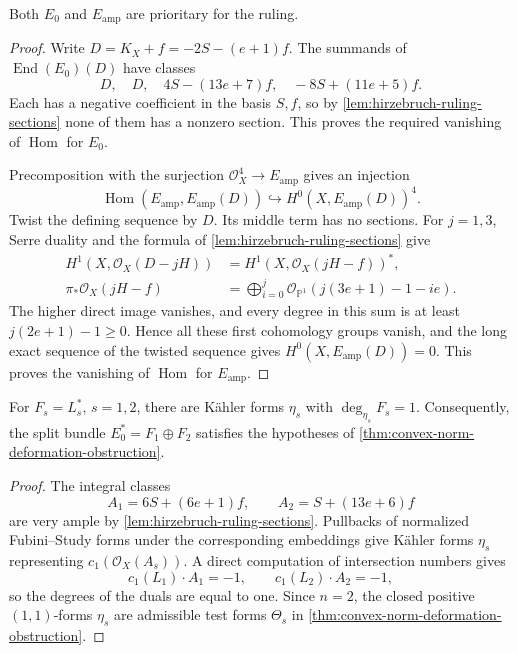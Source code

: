 \begin{lemma}\label{lem:hirzebruch-prioritary-comparison}
Both $E_0$ and $E_{\mathrm{amp}}$ are prioritary for the ruling.
\end{lemma}
\begin{proof}
Write $D=K_X+f=-2S-(e+1)f$. The summands of $\operatorname{End}(E_0)(D)$ have classes
\[
 D,\quad D,\quad 4S-(13e+7)f,\quad -8S+(11e+5)f.
\]
Each has a negative coefficient in the basis $S,f$, so by \cref{lem:hirzebruch-ruling-sections} none of them has a nonzero section. This proves the required vanishing of $\operatorname{Hom}$ for $E_0$.

Precomposition with the surjection $\mathcal O_X^4\to E_{\mathrm{amp}}$ gives an injection
\[
 \operatorname{Hom}(E_{\mathrm{amp}},E_{\mathrm{amp}}(D))
 \hookrightarrow H^0(X,E_{\mathrm{amp}}(D))^4.
\]
Twist the defining sequence by $D$. Its middle term has no sections. For $j=1,3$, Serre duality and the formula of \cref{lem:hirzebruch-ruling-sections} give
\[
 \begin{aligned}
 H^1(X,\mathcal O_X(D-jH))&=H^1(X,\mathcal O_X(jH-f))^*,\\
 \pi_*\mathcal O_X(jH-f)&=\bigoplus_{i=0}^j\mathcal O_{\mathbb P^1}(j(3e+1)-1-ie).
 \end{aligned}
\]
The higher direct image vanishes, and every degree in this sum is at least $j(2e+1)-1\geq0$. Hence all these first cohomology groups vanish, and the long exact sequence of the twisted sequence gives $H^0(X,E_{\mathrm{amp}}(D))=0$. This proves the vanishing of $\operatorname{Hom}$ for $E_{\mathrm{amp}}$.
\end{proof}

\begin{proposition}\label{prop:hirzebruch-positive-dual-tests}
For $F_s=L_s^*$, $s=1,2$, there are K\"ahler forms $\eta_s$ with $\deg_{\eta_s}F_s=1$. Consequently, the split bundle $E_0^*=F_1\oplus F_2$ satisfies the hypotheses of \cref{thm:convex-norm-deformation-obstruction}.
\end{proposition}
\begin{proof}
The integral classes
\[
 A_1=6S+(6e+1)f,\qquad A_2=S+(13e+6)f
\]
are very ample by \cref{lem:hirzebruch-ruling-sections}. Pullbacks of normalized Fubini--Study forms under the corresponding embeddings give K\"ahler forms $\eta_s$ representing $c_1(\mathcal O_X(A_s))$. A direct computation of intersection numbers gives
\[
 c_1(L_1)\cdot A_1=-1,\qquad
 c_1(L_2)\cdot A_2=-1,
\]
so the degrees of the duals are equal to one. Since $n=2$, the closed positive $(1,1)$-forms $\eta_s$ are admissible test forms $\Theta_s$ in \cref{thm:convex-norm-deformation-obstruction}.
\end{proof}

